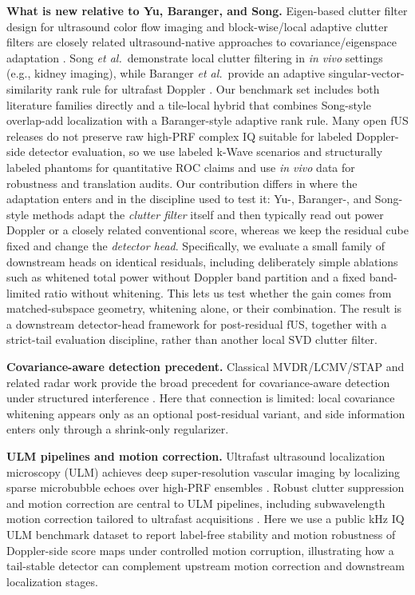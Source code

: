 \documentclass[11pt]{article}
\begin{document}
\textbf{What is new relative to Yu, Baranger, and Song.} Eigen-based clutter filter design for ultrasound color flow imaging and block-wise/local adaptive clutter filters are closely related ultrasound-native approaches to covariance/eigenspace adaptation \cite{YuLovstakkenEigenReview2010,SongBlockwiseLocal2017,CheeGPUEigen2017}. Song \emph{et al.}\ demonstrate local clutter filtering in \emph{in vivo} settings (e.g., kidney imaging), while Baranger \emph{et al.}\ provide an adaptive singular-vector-similarity rank rule for ultrafast Doppler \cite{BarangerAdaptiveSVD2018}. Our benchmark set includes both literature families directly and a tile-local hybrid that combines Song-style overlap-add localization with a Baranger-style adaptive rank rule. Many open fUS releases do not preserve raw high-PRF complex IQ suitable for labeled Doppler-side detector evaluation, so we use labeled k-Wave scenarios and structurally labeled phantoms for quantitative ROC claims and use \emph{in vivo} data for robustness and translation audits. Our contribution differs in where the adaptation enters and in the discipline used to test it: Yu-, Baranger-, and Song-style methods adapt the \emph{clutter filter} itself and then typically read out power Doppler or a closely related conventional score, whereas we keep the residual cube fixed and change the \emph{detector head}. Specifically, we evaluate a small family of downstream heads on identical residuals, including deliberately simple ablations such as whitened total power without Doppler band partition and a fixed band-limited ratio without whitening. This lets us test whether the gain comes from matched-subspace geometry, whitening alone, or their combination. The result is a downstream detector-head framework for post-residual fUS, together with a strict-tail evaluation discipline, rather than another local SVD clutter filter.

\textbf{Covariance-aware detection precedent.} Classical MVDR/LCMV/STAP and related radar work provide the broad precedent for covariance-aware detection under structured interference \cite{Capon1969Beamformer,FrostBeamformer,WardSTAPTutorial,GuerciSTAPBook2003,WicksKASTAP2006,MelvinGuerciKAParadigm2006,GurramGoodmanKASTAP2006}. Here that connection is limited: local covariance whitening appears only as an optional post-residual variant, and side information enters only through a shrink-only regularizer.

\textbf{ULM pipelines and motion correction.} Ultrafast ultrasound localization microscopy (ULM) achieves deep super-resolution vascular imaging by localizing sparse microbubble echoes over high-PRF ensembles \cite{ErricoULM2015}. Robust clutter suppression and motion correction are central to ULM pipelines, including subwavelength motion correction tailored to ultrafast acquisitions \cite{HingotULMMotion2017}. Here we use a public kHz IQ ULM benchmark dataset to report label-free stability and motion robustness of Doppler-side score maps under controlled motion corruption, illustrating how a tail-stable detector can complement upstream motion correction and downstream localization stages.
\end{document}
